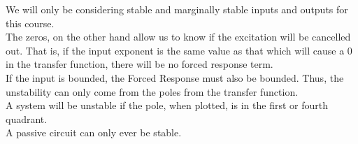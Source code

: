 \documentclass[nobib]{tufte-handout}
\begin{document}
\begin{center}
\end{center}

We will only be considering stable and marginally stable inputs and outputs for this course.\\
The zeros, on the other hand allow us to know if the excitation will be cancelled out. That is, if the input exponent is the same value as that which will cause a 0 in the transfer function, there will be no forced response term.\\
If the input is bounded, the Forced Response must also be bounded. Thus, the unstability can only come from the poles from the transfer function.\\
A system will be unstable if the pole, when plotted, is in the first or fourth quadrant.\\
A passive circuit can only ever be stable.\\
\end{document}
